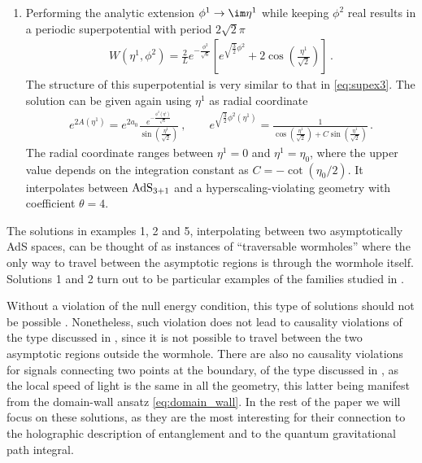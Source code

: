 \begin{enumerate}
\item Performing the analytic extension $\phi^1\to\im\eta^1$ while keeping $\phi^2$ real results in a periodic superpotential with period $2\sqrt{2}\pi$
\begin{align}
W(\eta^1,\phi^2)=\frac{2}{L}e^{-\frac{\phi^2}{\sqrt{6}}}\left[e^{\sqrt{\frac{3}{2}}\phi^2}+2\cos\left(\frac{\eta^1}{\sqrt{2}}\right)\right]\,.
\end{align}
The structure of this superpotential is very similar to that in \eqref{eq:supex3}. The solution can be given again using $\eta^1$ as radial coordinate
\begin{align}
	e^{2A(\eta^1)}=e^{2a_0}\frac{e^{-\frac{\phi^2(\eta^1)}{\sqrt{6}}}}{\sin\left(\frac{\eta^1}{\sqrt{2}}\right)}
	\ ,\qquad e^{\sqrt{\frac32}\phi^2(\eta^1)}=\frac{1}{\cos\left(\frac{\eta^1}{\sqrt{2}}\right)+C\sin\left(\frac{\eta^1}{\sqrt{2}}\right)}\,.
\end{align}
The radial coordinate ranges between $\eta^1=0$ and $\eta^1=\eta_0$, where the upper value depends on the integration constant as $C=-\cot\left(\eta_0/2\right)$. It interpolates between ${\rm AdS}_{3+1}$ and a hyperscaling-violating geometry with coefficient $\theta=4$.

\end{enumerate}

The solutions in examples 1, 2 and 5, interpolating between two asymptotically AdS spaces, can be thought of as instances of ``traversable wormholes'' where the only way to travel between the asymptotic regions is through the wormhole itself. Solutions 1 and 2 turn out to be particular examples of the families studied in \cite{Huang:2020qmn,Nozawa:2020gzz}.

Without a violation of the null energy condition, this type of solutions should not be possible \cite{Morris:1988tu,Hochberg:1998ii}. Nonetheless, such violation does not lead to causality violations of the type discussed in \cite{Morris:1988tu}, since it is not possible to travel between the two asymptotic regions outside the wormhole. There are also no causality violations for signals connecting two points at the boundary, of the type discussed in \cite{Hoyos:2010at}, as the local speed of light is the same in all the geometry, this latter being manifest from the domain-wall ansatz \eqref{eq:domain_wall}. In the rest of the paper we will focus on these solutions, as they are the most interesting for their connection to the holographic description of entanglement and to the quantum gravitational path integral.

